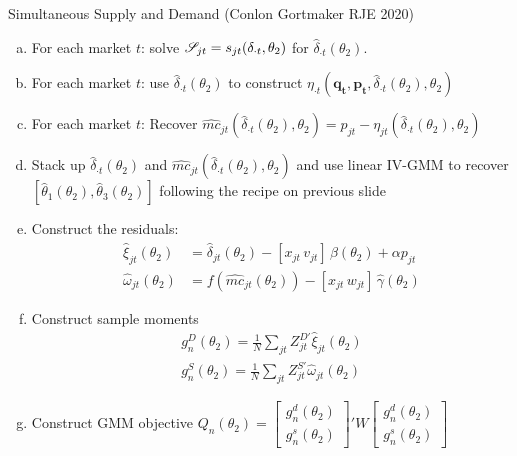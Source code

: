 \documentclass[aspectratio=169,11pt]{beamer}
\begin{document}
\begin{frame}{Simultaneous Supply and Demand (Conlon Gortmaker RJE 2020)}
\tiny
\begin{enumerate}[(a)]
\item For each market $t$: solve $\mathscr{S}_{jt} = s_{jt}(\delta_{\cdot t},\theta_2)$ for $\widehat{\delta}_{\cdot t}(\theta_2)$.
\item For each market $t$: use $\widehat{\delta}_{\cdot t}(\theta_2)$ to construct $\eta_{\cdot 
t}(\symbf{q_t},\symbf{p_t},\widehat{\delta}_{\cdot t}(\theta_2),\theta_2)$
\item For each market $t$: Recover $\widehat{mc}_{jt}(\widehat{\delta}_{\cdot t}(\theta_2),\theta_2) = p_{jt} - \eta_{jt}(\widehat{\delta}_{\cdot t}(\theta_2),\theta_2)$
\item Stack up $\widehat{\delta}_{\cdot t}(\theta_2)$ and $\widehat{mc}_{jt}(\widehat{\delta}_{\cdot t}(\theta_2),\theta_2)$ and use linear IV-GMM to recover $[\widehat{\theta}_1(\theta_2), \widehat{\theta}_3(\theta_2) ]$ following the recipe on previous slide
\item Construct the residuals:
\begin{align*}
\nonumber    \widehat{\xi}_{jt}(\theta_2) &= \widehat{\delta}_{jt}(\theta_2) -   [x_{jt}\, v_{jt}]\, \widehat{\beta}(\theta_2) + \alpha p_{jt}\\
    \widehat{\omega}_{jt}(\theta_2) &= f(\widehat{mc}_{jt}(\theta_2)) -  [x_{jt}\, w_{jt}]\, \widehat{\gamma}(\theta_2)
\end{align*}
\item Construct sample moments
\begin{align*}
\nonumber g_n^D(\theta_2)=\frac{1}{N} \sum_{jt} Z_{jt}^{D\prime} \widehat{\xi}_{jt}(\theta_2)\\
 g_n^S(\theta_2)=\frac{1}{N} \sum_{jt} Z_{jt}^{S \prime} \widehat{\omega}_{jt}(\theta_2)
\end{align*}
\item Construct GMM objective $Q_n(\theta_2)= \left[ {\begin{array}{c} g_n^d(\theta_2) \\ g_n^s(\theta_2) \end{array} } \right]' W  \left[ {\begin{array}{c} g_n^d(\theta_2) \\ g_n^s(\theta_2) \end{array} } \right] $
\end{enumerate}
\end{frame}
\end{document}
